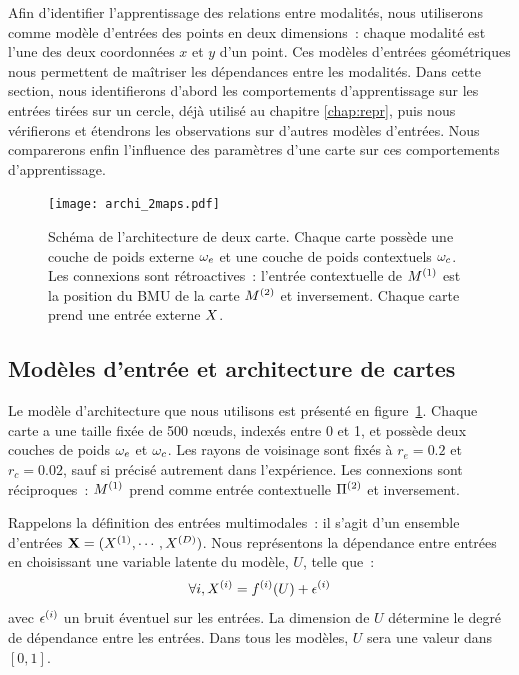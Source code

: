 \documentclass[../main]{subfiles}
\begin{document}
Afin d'identifier l'apprentissage des relations entre modalités, nous utiliserons comme modèle d'entrées des points en deux dimensions~: chaque modalité est l'une des deux coordonnées $x$ et $y$ d'un point.
Ces modèles d'entrées géométriques nous permettent de maîtriser les dépendances entre les modalités.
Dans cette section, nous identifierons d'abord les comportements d'apprentissage sur les entrées tirées sur un cercle, déjà utilisé au chapitre \ref{chap:repr}, puis nous vérifierons et étendrons les observations sur d'autres modèles d'entrées. Nous comparerons enfin l'influence des paramètres d'une carte sur ces comportements d'apprentissage.

\begin{figure}[ht]
	\centering\texttt{[image: archi\_2maps.pdf]}
	\caption{Schéma de l'architecture de deux carte. Chaque carte possède une couche de poids externe $\omega_e$ et une couche de poids contextuels $\omega_c$. Les connexions sont rétroactives~: l'entrée contextuelle de $M^{({1})}$ est la position du BMU de la carte $M^{({2})}$ et inversement. 
	Chaque carte prend une entrée externe $X$.\label{fig:archis}}
\end{figure}

\subsection{Modèles d'entrée et architecture de cartes}

Le modèle d'architecture que nous utilisons est présenté en figure~\ref{fig:archis}.
Chaque carte a une taille fixée de 500 n\oe{}uds, indexés entre 0 et 1, et possède deux couches de poids $\omega_e$ et $\omega_c$. 
Les rayons de voisinage sont fixés à $r_e = 0.2$ et $r_c = 0.02$, sauf si précisé autrement dans l'expérience.
Les connexions sont réciproques~: $M^{({1})}$ prend comme entrée contextuelle $\Pi^{({2})}$ et inversement.

Rappelons la définition des entrées multimodales~: il s'agit d'un ensemble d'entrées $\mathbf{X} = (X^{({1})}, \cdots, X^{({D})})$.
Nous représentons la dépendance entre entrées en choisissant une variable latente du modèle, $U$, telle que~:
$$ \forall i, X^{({i})} = f^{({i})}(U) + \epsilon^{({i})}$$
avec $\epsilon^{({i})}$ un bruit éventuel sur les entrées.
La dimension de $U$ détermine le degré de dépendance entre les entrées.
Dans tous les modèles, $U$ sera une valeur dans $[0,1]$.
\end{document}

